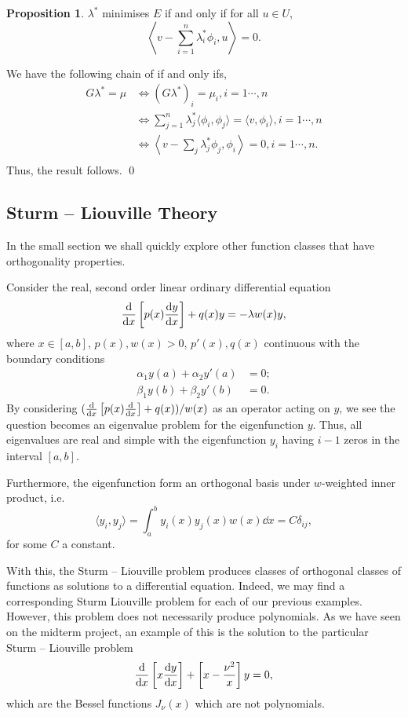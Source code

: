 \documentclass[
]{article}
\theoremstyle{definition}
\newtheorem{prop}{Proposition}
\theoremstyle{definition}
\begin{document}
\begin{prop}
  \(\lambda^*\) minimises \(E\) if and only if for all \(u \in U\), 
  \[\left\langle v - \sum_{i = 1}^n \lambda^*_i \phi_i, u \right\rangle = 0.\]
\end{prop}
\proof

We have the following chain of if and only ifs, \[\begin{split}
    G \lambda^* = \mu & \iff (G \lambda^*)_i = \mu_i, i = 1 \cdots, n\\
      & \iff \sum_{j = 1}^n \lambda^*_j \langle \phi_i, \phi_j \rangle = 
        \langle v, \phi_i \rangle, i = 1 \cdots, n\\
      & \iff \left\langle v - \sum_j \lambda^*_j \phi_j, \phi_i \right\rangle = 0, 
        i = 1 \cdots, n.\\
  \end{split}\] Thus, the result follows. \qed

\hypertarget{sturm-liouville-theory}{%
\subsection{Sturm -- Liouville Theory}\label{sturm-liouville-theory}}

In the small section we shall quickly explore other function classes
that have orthogonality properties.

Consider the real, second order linear ordinary differential equation
\[\dv{x}\left[p(x) \dv{y}{x}\right] + q(x) y = -\lambda w(x)y,\] where
\(x \in [a, b]\), \(p(x), w(x) > 0\), \(p'(x), q(x)\) continuous with
the boundary conditions \[\begin{split}
  \alpha_1 y(a) + \alpha_2 y'(a) & = 0;\\
  \beta_1 y(b) + \beta_2 y'(b) & = 0.
\end{split}\] By considering
\((\dv{x}\left[p(x) \dv{x}\right] + q(x)) / w(x)\) as an operator acting
on \(y\), we see the question becomes an eigenvalue problem for the
eigenfunction \(y\). Thus, all eigenvalues are real and simple with the
eigenfunction \(y_i\) having \(i - 1\) zeros in the interval \([a, b]\).

Furthermore, the eigenfunction form an orthogonal basis under
\(w\)-weighted inner product, i.e.~
\[\langle y_i, y_j \rangle = \int_a^b y_i(x) y_j(x) w(x) \dd x = C \delta_{ij},\]
for some \(C\) a constant.

With this, the Sturm -- Liouville problem produces classes of orthogonal
classes of functions as solutions to a differential equation. Indeed, we
may find a corresponding Sturm Liouville problem for each of our
previous examples. However, this problem does not necessarily produce
polynomials. As we have seen on the midterm project, an example of this
is the solution to the particular Sturm -- Liouville problem
\[\dv{x}\left[x \dv{y}{x}\right] + \left[x - \frac{\nu^2}{x}\right] y = 0,\]
which are the Bessel functions \(J_{\nu}(x)\) which are not polynomials.
\end{document}
